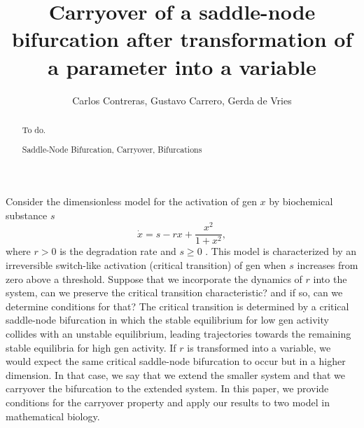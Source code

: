 \documentclass[12pt]{article}
\title{Carryover of a saddle-node bifurcation after transformation of a parameter into a variable}
\author{Carlos Contreras, Gustavo Carrero, Gerda de Vries}
\begin{document}
\maketitle


\begin{abstract}
To do.

Saddle-Node Bifurcation, Carryover, Bifurcations
\end{abstract}
 

\linenumbers


Consider the dimensionless model for the activation of gen $x$ by biochemical substance $s$
\begin{equation}
    \dot x = s - rx + \frac{x^{2}}{1+x^{2}},
    \label{equ:Example:GenActivation:1D}
\end{equation}
where $r>0$ is the degradation rate and $s\geq0$ \citep{Strogatz1994, Lewis1977}. This model is characterized by an irreversible switch-like activation (critical transition) of gen when $s$ increases from zero above a threshold. Suppose that we incorporate the dynamics of $r$ into the system, can we preserve the critical transition characteristic? and if so, can we determine conditions for that? The critical transition is determined by a critical saddle-node bifurcation in which the stable equilibrium for low gen activity collides with an unstable equilibrium, leading trajectories towards the remaining stable equilibria for high gen activity. If $r$ is transformed into a variable, we would expect the same critical saddle-node bifurcation to occur but in a higher dimension. In that case, we say that we extend the smaller system and that we carryover the bifurcation to the extended system. In this paper, we provide conditions for the carryover property and apply our results to two model in mathematical biology.

\end{document}

